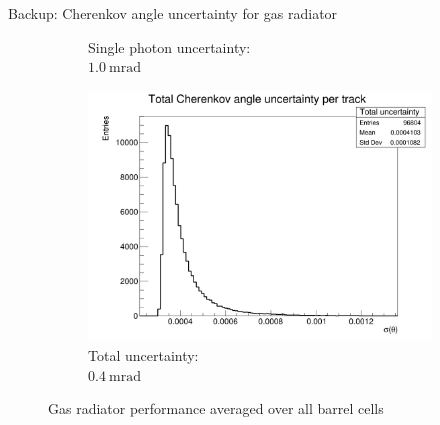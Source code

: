 \documentclass{beamer}
\begin{document}
\begin{frame}{Backup: Cherenkov angle uncertainty for gas radiator}
\begin{figure}
\begin{subfigure}{0.35\textwidth}
      \caption{Single photon uncertainty:\\ $\SI{1.0}{\milli\radian}$}
    \end{subfigure}%
    \begin{subfigure}{0.35\textwidth}
      \includegraphics[width = 1.0\textwidth]{Plots/TotalCherenkovUncertainty_Barrel_Gas.png}
      \vspace{-0.75cm}
      \caption{Total uncertainty:\\ $\SI{0.4}{\milli\radian}$}
    \end{subfigure}
    \vspace{-0.1cm}
    \caption{Gas radiator performance averaged over all barrel cells}
  \end{figure}
\end{frame}
\end{document}

